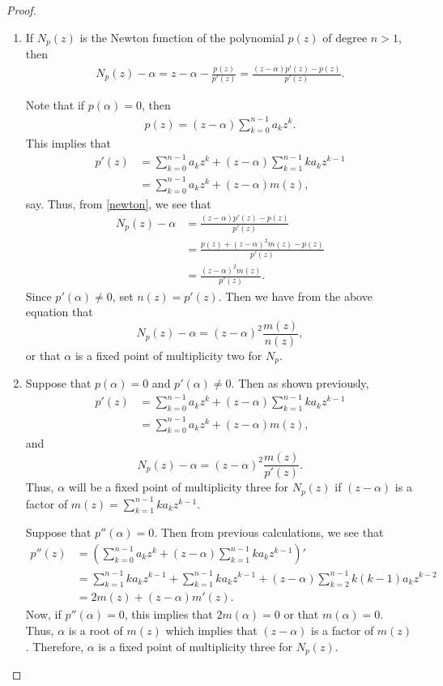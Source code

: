 \begin{proof}
  \begin{enumerate}
    \item If $N_p(z)$ is the Newton function of the polynomial $p(z)$ of degree $n > 1$, then
      \begin{align}\label{newton}
        N_p(z) - \alpha = z - \alpha - \frac{p(z)}{p'(z)} = \frac{(z-\alpha)p'(z) - p(z)}{p'(z)}.
      \end{align}

      Note that if $p(\alpha) = 0$, then
      \begin{align*}
        p(z) = (z-\alpha)\sum_{k=0}^{n-1}a_k z^k.
      \end{align*}
      This implies that
      \begin{align*}
        p'(z) &= \sum_{k=0}^{n-1}a_k z^k + (z-\alpha)\sum_{k=1}^{n-1}k a_k z^{k-1} \\
        &= \sum_{k=0}^{n-1}a_k z^k + (z-\alpha)m(z),
      \end{align*}
      say. Thus, from \eqref{newton}, we see that
      \begin{align*}
        N_p(z) - \alpha &= \frac{(z-\alpha)p'(z) - p(z)}{p'(z)} \\
        &= \frac{p(z) + (z-\alpha)^2m(z) - p(z)}{p'(z)} \\
        &= \frac{(z-\alpha)^2m(z)}{p'(z)}.
      \end{align*}
      Since $p'(\alpha) \neq 0$, set $n(z) = p'(z)$. Then we have from the above
      equation that
      $$N_p(z) - \alpha = (z-\alpha)^2 \frac{m(z)}{n(z)},$$ or that $\alpha$
      is a fixed point of multiplicity two for $N_p$.

    \item Suppose that $p(\alpha) = 0$ and $p'(\alpha) \neq 0$.
      Then as shown previously,
      \begin{align*}
        p'(z) &= \sum_{k=0}^{n-1}a_k z^k + (z-\alpha)\sum_{k=1}^{n-1}k a_k z^{k-1} \\
        &= \sum_{k=0}^{n-1}a_k z^k + (z-\alpha)m(z),
      \end{align*}
      and
      $$N_p(z) - \alpha = (z-\alpha)^2 \frac{m(z)}{p'(z)}.$$
      Thus, $\alpha$ will be a fixed point of multiplicity three for $N_p(z)$
      if $(z-\alpha)$ is a factor of $m(z) = \sum_{k=1}^{n-1}k a_k z^{k-1}$.

      Suppose that $p''(\alpha) = 0$. Then from previous calculations, we see that
      \begin{align*}
        p''(z) &= \left(\sum_{k=0}^{n-1}a_k z^k + (z-\alpha)\sum_{k=1}^{n-1}k a_k z^{k-1}\right)' \\
        &= \sum_{k=1}^{n-1}k a_k z^{k-1} + \sum_{k=1}^{n-1}k a_k z^{k-1} + (z-\alpha)\sum_{k=2}^{n-1}k (k-1) a_k z^{k-2} \\
        &= 2m(z) + (z-\alpha)m'(z).
      \end{align*}
      Now, if $p''(\alpha) = 0$, this implies that $2m(\alpha) = 0$ or that $m(\alpha) = 0$.
      Thus, $\alpha$ is a root of $m(z)$ which implies that $(z-\alpha)$ is a factor of $m(z)$.
      Therefore, $\alpha$ is a fixed point of multiplicity three for $N_p(z)$.
  \end{enumerate}
\end{proof}
\newpage
